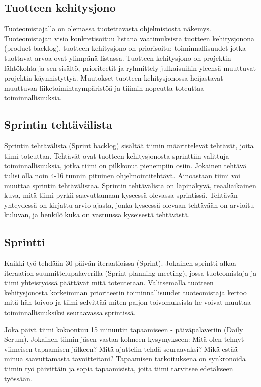 \documentclass[finnish]{tktltiki2}
\theoremstyle{definition}
\theoremstyle{remark}
\begin{document}
\subsection*{Tuotteen kehitysjono}

Tuoteomistajalla on olemassa tuotettavasta ohjelmistosta näkemys. Tuoteomistajan visio konkretisoituu listana vaatimuksista tuotteen kehitysjonona (product backlog). tuotteen kehitysjono on priorisoitu: toiminnallisuudet jotka tuottavat arvoa ovat ylimpänä listassa. Tuotteen kehitysjono on projektin lähtökohta ja sen sisältö, prioriteetit ja ryhmittely julkaisuihin yleensä muuttuvat projektin käynnistyttyä. Muutokset tuotteen kehitysjonossa heijastavat muuttuvaa liiketoimintaympäristöä ja tiiimin nopeutta toteuttaa toiminnallisuuksia\cite{SCH09}.

\subsection*{Sprintin tehtävälista}

Sprintin tehtävälista (Sprint backlog) sisältää tiimin määrittelevät tehtävät, joita tiimi toteuttaa. Tehtävät ovat tuotteen kehitysjonosta sprinttiin valittuja toiminnallisuuksia, jotka tiimi on pilkkonut pienempiin osiin. Jokainen tehtävä tulisi olla noin 4-16 tunnin pituinen ohjelmointitehtävä. Ainoastaan tiimi voi muuttaa sprintin tehtävälistaa. Sprintin tehtävälista on läpinäkyvä, reaaliaikainen kuva, mitä tiimi pyrkii saavuttamaan kyseessä olevassa sprintissä. Tehtävän yhteydessä on kirjattu arvio ajasta, jonka kyseessä olevaan tehtävään on arvioitu kuluvan, ja henkilö kuka on vastuussa kyseisestä tehtävästä\cite{SCH09}.

\subsection*{Sprintti}

Kaikki työ tehdään 30 päivän iteraatioissa (Sprint). Jokainen sprintti alkaa iteraation suunnittelupalaverilla (Sprint planning meeting), jossa tuoteomistaja ja tiimi yhteistyössä päättävät mitä toteutetaan. Valitsemalla tuotteen kehitysjonosta korkeimman prioriteetin toiminnallisuudet tuoteomistaja kertoo mitä hän toivoo ja tiimi selvittää miten paljon toivomuksista he voivat muuttaa toiminnallisuuksiksi seuraavassa sprintissä\cite{SCH09}.

Joka päivä tiimi kokoontuu 15 minuutin tapaamiseen - päiväpalaveriin (Daily Scrum). Jokainen tiimin jäsen vastaa kolmeen kysymykseen: Mitä olen tehnyt viimeisen tapaamisen jälkeen? Mitä ajattelin tehdä seuraavaksi? Mikä estää minua saavuttamasta tavoitteitani? Tapaamisen tarkoituksena on synkronoida tiimin työ päivittäin ja sopia tapaamisista, joita tiimi tarvitsee edetäkseen työssään\cite{SCH09}.
\end{document}
